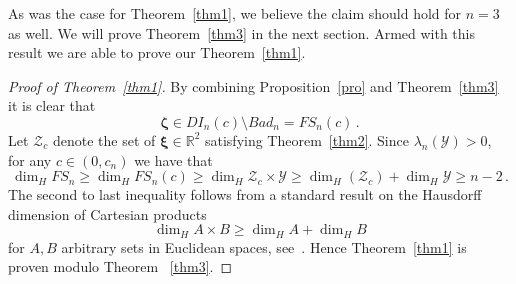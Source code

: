 \documentclass[10pt]{amsart}
\theoremstyle{definition}
\newcommand{\ux}{\boldsymbol{\xi}}
\newcommand{\uz}{\boldsymbol{\zeta}}
\newcommand{\R}{\mathbb{R}}
\begin{document}
As was the case for Theorem~\ref{thm1}, we believe the claim should hold for $n=3$ as well. We will prove Theorem~\ref{thm3} in the next section. Armed with this result we are able to prove our Theorem~\ref{thm1}.

\begin{proof}[Proof of Theorem~\ref{thm1}]
By combining Proposition~\ref{pro} and Theorem~\ref{thm3} it is clear that
\[
\uz\in DI_n(c)\setminus Bad_n= FS_n(c)\, .
\]
Let $\mathcal{Z}_{c}$ denote the set of $\ux \in \R^{2}$ satisfying Theorem~\ref{thm2}. Since $\lambda_{n}(\mathcal{Y})>0$, for any $c\in(0,c_n)$ we have that
\[
\dim_H FS_n \ge \dim_H FS_n(c)  \ge \dim_H \mathcal{Z}_{c}\times \mathcal{Y} \geq  \dim_H(\mathcal{Z}_{c})+ \dim_H \mathcal{Y}  \geq  n-2\, .
\]
The second to last inequality follows from a standard result on the Hausdorff dimension of Cartesian products
\begin{equation}  \label{eq:tric}
    \dim_H A\times B \ge \dim_H A  + \dim_H B 
\end{equation}
for $A,B$ arbitrary sets in Euclidean spaces, see~\cite{tricot}. Hence Theorem~\ref{thm1} is proven modulo Theorem ~\ref{thm3}. 
\end{proof}

\end{document}
